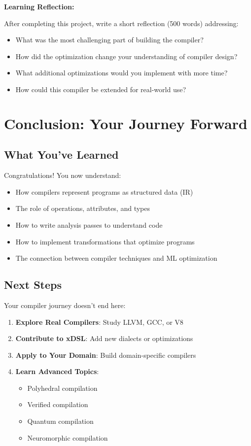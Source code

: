 \documentclass[11pt,a4paper]{article}
\begin{document}
\textbf{Learning Reflection:}

After completing this project, write a short reflection (500 words) addressing:
\begin{itemize}
    \item What was the most challenging part of building the compiler?
    \item How did the optimization change your understanding of compiler design?
    \item What additional optimizations would you implement with more time?
    \item How could this compiler be extended for real-world use?
\end{itemize}

\section{Conclusion: Your Journey Forward}

\subsection{What You've Learned}

Congratulations! You now understand:
\begin{itemize}
    \item How compilers represent programs as structured data (IR)
    \item The role of operations, attributes, and types
    \item How to write analysis passes to understand code
    \item How to implement transformations that optimize programs
    \item The connection between compiler techniques and ML optimization
\end{itemize}

\subsection{Next Steps}

Your compiler journey doesn't end here:

\begin{enumerate}
    \item \textbf{Explore Real Compilers}: Study LLVM, GCC, or V8
    \item \textbf{Contribute to xDSL}: Add new dialects or optimizations
    \item \textbf{Apply to Your Domain}: Build domain-specific compilers
    \item \textbf{Learn Advanced Topics}:
    \begin{itemize}
        \item Polyhedral compilation
        \item Verified compilation
        \item Quantum compilation
        \item Neuromorphic compilation
    \end{itemize}
\end{enumerate}
\end{document}
